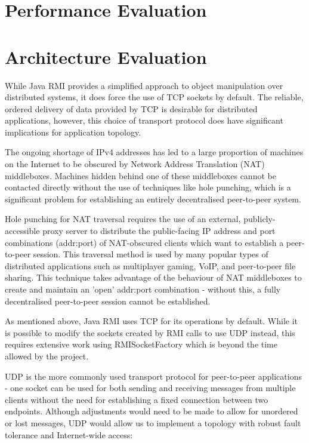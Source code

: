 \documentclass[conference]{IEEEtran}
\begin{document}
\section{Performance Evaluation}



\section{Architecture Evaluation}
While Java RMI provides a simplified approach to object manipulation over distributed systems, it does force the use of TCP sockets by default. The reliable, ordered delivery of data provided by TCP is desirable for distributed applications, however, this choice of transport protocol does have significant implications for application topology.

The ongoing shortage of IPv4 addresses has led to a large proportion of machines on the Internet to be obscured by Network Address Translation (NAT) middleboxes. Machines hidden behind one of these middleboxes cannot be contacted directly without the use of techniques like hole punching, which is a significant problem for establishing an entirely decentralised peer-to-peer system.

Hole punching for NAT traversal requires the use of an external, publicly-accessible proxy server to distribute the public-facing IP address and port combinations (addr:port) of NAT-obscured clients which want to establish a peer-to-peer session. This traversal method is used by many popular types of distributed applications such as multiplayer gaming, VoIP, and peer-to-peer file sharing. This technique takes advantage of the behaviour of NAT middleboxes to create and maintain an 'open' addr:port combination - without this, a fully decentralised peer-to-peer session cannot be established.

As mentioned above, Java RMI uses TCP for its operations by default. While it is possible to modify the sockets created by RMI calls to use UDP instead, this requires extensive work using RMISocketFactory which is beyond the time allowed by the project.

UDP is the more commonly used transport protocol for peer-to-peer applications - one socket can be used for both sending and receiving messages from multiple clients without the need for establishing a fixed connection between two endpoints. Although adjustments would need to be made to allow for unordered or lost messages, UDP would allow us to implement a topology with robust fault tolerance and Internet-wide access:
\end{document}
